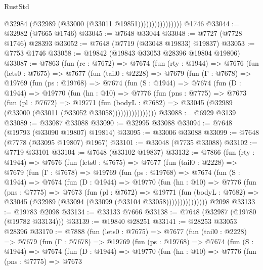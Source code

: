 \begin{lexlean}{RustStd}
\begin{coremodule}
                            @32984 (@32989 (@33000 (@33011 @19851))))))))))))))))
    @1746
@33044 := @32982 (@7665 @1746)
@33045 := @7648 @33044
@33048 := @7727 (@7728 @1746) @28393
@33052 := @7648 (@7719 (@33048 @19833) @19837)
@33053 := @7753 @1746
@33058 := @19842 (@19843 @33053 @28396 @19804 @19806)
@33087 := @7863
    (fun (rc : @7672) =>
    @7674
      (fun (rty : @1944) =>
      @7676
        (fun (lets0 : @7675) =>
        @7677
          (fun (tail0 : @2228) =>
          @7679
            (fun (Γ : @7678) =>
            @19769
              (fun (ps : @19768) =>
              @7674
                (fun (S : @1944) =>
                @7674
                  (fun (D : @1944) =>
                  @19770
                    (fun (hn : @10) =>
                    @7776
                      (fun (pns : @7775) =>
                      @7673
                        (fun (pl : @7672) =>
                        @19771
                          (fun (bodyL : @7682) =>
                          @33045 (@32989 (@33000 (@33011 (@33052 @33058))))))))))))))))
@33088 := @6929 @3139
@33089 := @33087 @33088
@33090 := @32995 @33088
@33094 := @7648 (@19793 (@33090 @19807) @19814)
@33095 := @33006 @33088
@33099 := @7648 (@7778 (@33095 @19807) @1967)
@33101 := @33048 (@7735 @33088)
@33102 := @7719 @33101
@33104 := @7648 (@33102 @19837)
@33132 := @7866
    (fun (rty : @1944) =>
    @7676
      (fun (lets0 : @7675) =>
      @7677
        (fun (tail0 : @2228) =>
        @7679
          (fun (Γ : @7678) =>
          @19769
            (fun (ps : @19768) =>
            @7674
              (fun (S : @1944) =>
              @7674
                (fun (D : @1944) =>
                @19770
                  (fun (hn : @10) =>
                  @7776
                    (fun (pns : @7775) =>
                    @7673
                      (fun (pl : @7672) =>
                      @19771
                        (fun (bodyL : @7682) =>
                        @33045 (@32989 (@33094 (@33099 (@33104 @33058)))))))))))))))
    @2098
@33133 := @19783 @2098
@33134 := @33133 @7666
@33138 := @7648 (@32987 (@19780 (@19782 @33134)))
@33139 := @19840 @28251
@33141 := @28253 @33053 @28396
@33170 := @7888
    (fun (lets0 : @7675) =>
    @7677
      (fun (tail0 : @2228) =>
      @7679
        (fun (Γ : @7678) =>
        @19769
          (fun (ps : @19768) =>
          @7674
            (fun (S : @1944) =>
            @7674
              (fun (D : @1944) =>
              @19770
                (fun (hn : @10) =>
                @7776
                  (fun (pns : @7775) =>
                  @7673

\end{coremodule}
\end{lexlean}
